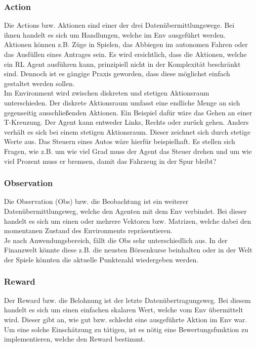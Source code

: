 \subsubsection{Action} \label{subsubsec:Grundlagen_Action}
Die Actions bzw. Aktionen sind einer der drei Datenübermittlungswege. Bei ihnen handelt es sich um Handlungen, welche im Env ausgeführt werden. Aktionen können z.B. Züge in Spielen, das Abbiegen im autonomen Fahren oder das Ausfüllen eines Antrages sein. Es wird ersichtlich, dass die Aktionen, welche ein RL Agent ausführen kann, prinzipiell nicht in der Komplexität beschränkt sind. 
Dennoch ist es gängige Praxis geworden, dass diese möglichst einfach gestaltet werden sollen.\\
Im Environment wird zwischen diskreten und stetigen Aktionsraum unterschieden. Der diskrete Aktionsraum umfasst eine endliche Menge an sich gegenseitig ausschließenden Aktionen. Ein Beispiel dafür wäre das Gehen an einer T-Kreuzung. Der Agent kann entweder Links, Rechts oder zurück gehen.
Anders verhält es sich bei einem stetigen Aktionsraum. Dieser zeichnet sich durch stetige Werte aus. Das Steuern eines Autos wäre hierfür beispielhaft. Es stellen sich Fragen, wie z.B. um wie viel Grad muss der Agent das Steuer drehen und um wie viel Prozent muss er bremsen, damit das Fahrzeug in der Spur bleibt? \citep[S. 31 f.]{DRL_Lapan}

\subsubsection{Observation} \label{subsubsec:Grundlagen_Observation}
Die Observation (Obs) bzw. die Beobachtung ist ein weiterer Datenübermittlungsweg, welche den Agenten mit dem Env verbindet. Bei dieser handelt es sich um einen oder mehrere Vektoren bzw. Matrizen, welche dabei den momentanen Zustand des Environments repräsentieren. \citep[S. 381]{Sutton1998}\\
Je nach Anwendungsbereich, fällt die Obs sehr unterschiedlich aus. In der Finanzwelt könnte diese z.B. die neusten Börsenkurse beinhalten oder in der Welt der Spiele könnten die aktuelle Punktezahl wiedergeben werden. \citep[S. 32]{DRL_Lapan}

\subsubsection{Reward} \label{subsubsec:Grundlagen_Reward}
Der Reward bzw. die Belohnung ist der letzte Datenübertragungsweg.
Bei diesem handelt es sich um einen einfachen skalaren Wert, welche vom Env übermittelt wird. Dieser gibt an, wie gut bzw. schlecht eine ausgeführte Aktion im Env war. \citep[S. 42]{Sutton1998}\\
Um eine solche Einschätzung zu tätigen, ist es nötig eine Bewertungsfunktion zu implementieren, welche den Reward bestimmt.

